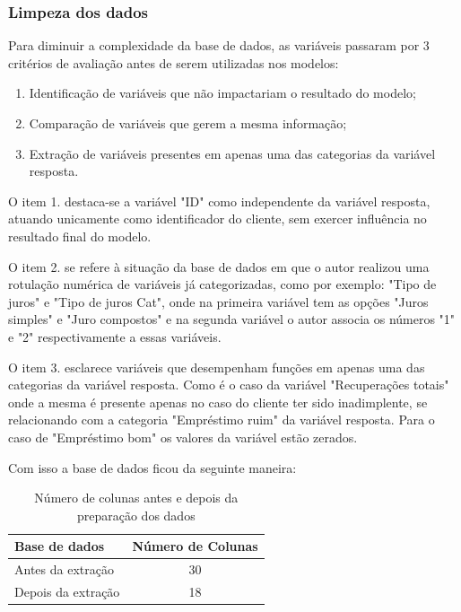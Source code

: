 \subsubsection{Limpeza dos dados}

Para diminuir a complexidade da base de dados, as variáveis passaram por 3 critérios de avaliação antes de serem utilizadas
nos modelos:

\begin{enumerate}
  \item Identificação de variáveis que não impactariam o resultado do modelo;
  \item Comparação de variáveis que gerem a mesma informação;
  \item Extração de variáveis presentes em apenas uma das categorias da variável resposta.
\end{enumerate}

O item 1. destaca-se a variável "ID" como independente da variável resposta, 
atuando unicamente como identificador do cliente, sem exercer influência no resultado final do modelo.

O item 2. se refere à situação da base de dados em que o autor realizou uma rotulação numérica de variáveis 
já categorizadas, como por exemplo: 
"Tipo de juros" e "Tipo de juros Cat", onde na primeira variável tem as opções "Juros simples" e "Juro compostos" e na segunda variável
o autor associa os números "1" e "2" respectivamente a essas variáveis.

O item 3. esclarece variáveis que desempenham funções em apenas uma das categorias da variável resposta. Como é o caso da 
variável "Recuperações totais" onde a mesma é presente apenas no caso do cliente ter sido inadimplente, se relacionando
com a categoria "Empréstimo ruim" da variável resposta. Para o caso de "Empréstimo bom" os valores da variável estão zerados.

Com isso a base de dados ficou da seguinte maneira:

\begin{table}[h]
  \centering
  \begin{tabular}{l|c}
  \hline
  \textbf{Base de dados} & \textbf{Número de Colunas} \\ \hline
  Antes da extração & 30 \\ 
  Depois da extração & 18 \\ \hline
  \end{tabular}
  \caption{Número de colunas antes e depois da preparação dos dados}
  \label{table:columns_before_after}
\end{table}

